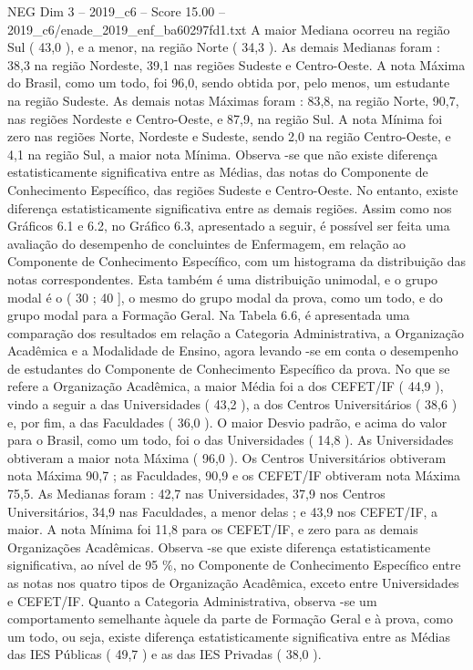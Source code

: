 \begin{textsample}{NEG Dim 3 – 2019\_c6 – Score 15.00 – 2019\_c6/enade\_2019\_enf\_ba60297fd1.txt}
A maior Mediana ocorreu na região Sul ( 43,0 ), e a menor, na região Norte ( 34,3 ).
As demais Medianas foram : 38,3 na região Nordeste, 39,1 nas regiões Sudeste e Centro-Oeste.
A nota Máxima do Brasil, como um todo, foi 96,0, sendo obtida por, pelo menos, um estudante na região Sudeste.
As demais notas Máximas foram : 83,8, na região Norte, 90,7, nas regiões Nordeste e Centro-Oeste, e 87,9, na região Sul.
A nota Mínima foi zero nas regiões Norte, Nordeste e Sudeste, sendo 2,0 na região Centro-Oeste, e 4,1 na região Sul, a maior nota Mínima.
Observa -se que não existe diferença estatisticamente significativa entre as Médias, das notas do Componente de Conhecimento Específico, das regiões Sudeste e Centro-Oeste.
No entanto, existe diferença estatisticamente significativa entre as demais regiões.
Assim como nos Gráficos 6.1 e 6.2, no Gráfico 6.3, apresentado a seguir, é possível ser feita uma avaliação do desempenho de concluintes de Enfermagem, em relação ao Componente de Conhecimento Específico, com um histograma da distribuição das notas correspondentes.
Esta também é uma distribuição unimodal, e o grupo modal é o ( 30 ; 40 ], o mesmo do grupo modal da prova, como um todo, e do grupo modal para a Formação Geral.
Na Tabela 6.6, é apresentada uma comparação dos resultados em relação a Categoria Administrativa, a Organização Acadêmica e a Modalidade de Ensino, agora levando -se em conta o desempenho de estudantes do Componente de Conhecimento Específico da prova.
No que se refere a Organização Acadêmica, a maior Média foi a dos CEFET/IF ( 44,9 ), vindo a seguir a das Universidades ( 43,2 ), a dos Centros Universitários ( 38,6 ) e, por fim, a das Faculdades ( 36,0 ).
O maior Desvio padrão, e acima do valor para o Brasil, como um todo, foi o das Universidades ( 14,8 ).
As Universidades obtiveram a maior nota Máxima ( 96,0 ).
Os Centros Universitários obtiveram nota Máxima 90,7 ; as Faculdades, 90,9 e os CEFET/IF obtiveram nota Máxima 75,5.
As Medianas foram : 42,7 nas Universidades, 37,9 nos Centros Universitários, 34,9 nas Faculdades, a menor delas ; e 43,9 nos CEFET/IF, a maior.
A nota Mínima foi 11,8 para os CEFET/IF, e zero para as demais Organizações Acadêmicas.
Observa -se que existe diferença estatisticamente significativa, ao nível de 95 \%, no Componente de Conhecimento Específico entre as notas nos quatro tipos de Organização Acadêmica, exceto entre Universidades e CEFET/IF.
Quanto a Categoria Administrativa, observa -se um comportamento semelhante àquele da parte de Formação Geral e à prova, como um todo, ou seja, existe diferença estatisticamente significativa entre as Médias das IES Públicas ( 49,7 ) e as das IES Privadas ( 38,0 ).

\end{textsample}
